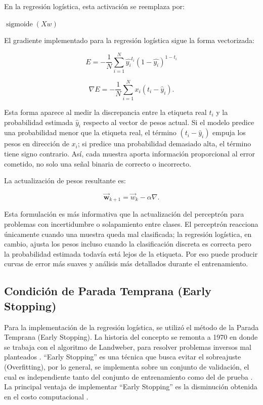\documentclass[12pt]{article}
\begin{document}
En la regresión logística, esta activación se reemplaza por:

\begin{algorithm}[H]
\caption{Activación de regresión logística}
\begin{algorithmic}[1]
    \State \Return $\operatorname{sigmoide}(Xw)$
\EndFunction
\end{algorithmic}
\end{algorithm}

El gradiente implementado para la regresión logística sigue la forma vectorizada:

\begin{equation}
E = -\frac{1}{N} \sum_{i=1}^N \hat{y_i}^{t_i}(1-\hat{y_i})^{1-t_i}
\end{equation}

\begin{equation}
\nabla E =
-\frac{1}{N}\sum_{i=1}^{N} x_i(t_i - \hat{y}_i).
\end{equation}

Esta forma aparece al medir la discrepancia entre la etiqueta real $t_i$ y la probabilidad estimada $\hat{y}_i$ respecto al vector de pesos actual. Si el modelo predice una probabilidad menor que la etiqueta real, el término $(t_i-\hat{y}_i)$ empuja los pesos en dirección de $x_i$; si predice una probabilidad demasiado alta, el término tiene signo contrario. Así, cada muestra aporta información proporcional al error cometido, no solo una señal binaria de correcto o incorrecto.

La actualización de pesos resultante es:

\begin{equation}
\mathbf{\vec w}_{k+1} = \vec w_k - \alpha \nabla.
\end{equation}

Esta formulación es más informativa que la actualización del perceptrón para problemas con incertidumbre o solapamiento entre clases. El perceptrón reacciona únicamente cuando una muestra queda mal clasificada; la regresión logística, en cambio, ajusta los pesos incluso cuando la clasificación discreta es correcta pero la probabilidad estimada todavía está lejos de la etiqueta. Por eso puede producir curvas de error más suaves y análisis más detallados durante el entrenamiento.

\subsection{Condición de Parada Temprana (Early Stopping)}
\label{sec::early_stop}
Para la implementación de la regresión logística, se utilizó el método de la Parada Temprana (Early Stopping). La historia del concepto se remonta a 1970 en donde se trabaja con el algoritmo de Landweber, para resolver problemas inversos mal planteados \cite{Raskutti2013}. ``Early Stopping'' es una técnica que busca evitar el sobreajuste (Overfitting), por lo general, se implementa sobre un conjunto de validación, el cual es independiente tanto del conjunto de entrenamiento como del de prueba \cite{choi2022early}. La principal ventaja de implementar ``Early Stopping'' es la disminución obtenida en el costo computacional \cite{Raskutti2013}.
\end{document}
